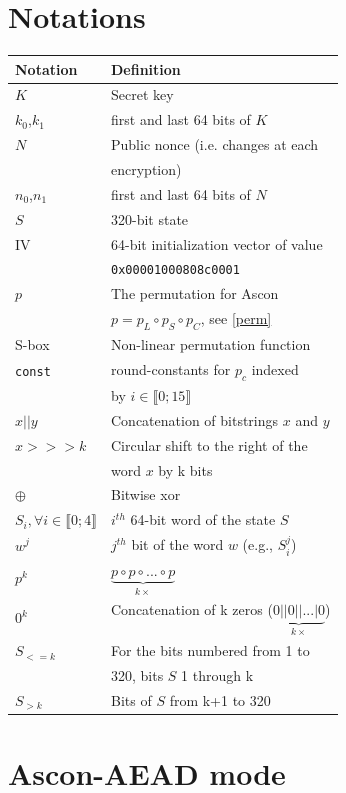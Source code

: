 \documentclass[11pt,technote]{IEEEtran}
\begin{document}
		\section{Notations} \label{notations}
		\begin{tabular}{ll}
				\hline
				\textbf{Notation}&\textbf{Definition}\\
				\hline
				$K$&Secret key\\
				$k_0$,$k_1$&first and last 64 bits of $K$\\
				$N$&Public nonce (i.e. changes at each\\
				&encryption)\\
				$n_0$,$n_1$&first and last 64 bits of $N$\\
				$S$&320-bit state\\
				IV&64-bit initialization vector of value\\
				&\verb|0x00001000808c0001|\\
				$p$&The permutation for Ascon \\
				&$p=p_L \circ p_S \circ p_C$, see \ref{perm}\\
				S-box&Non-linear permutation function\\
				\verb|const|&round-constants for $p_c$ indexed \\
				&by $i \in \llbracket 0;15 \rrbracket$ \\
				\hline
				$x||y$&Concatenation of bitstrings $x$ and $y$\\
				$x>>>k$&Circular shift to the right of the\\
				&word $x$ by k bits\\
				$\oplus$&Bitwise xor\\
				\hline
				$S_i, \forall i \in \llbracket 0;4 \rrbracket$&$i^{th}$ 64-bit word of the state $S$\\
				$w^j$&$j^{th}$ bit of the word $w$ (e.g., $S_i^j$) \\
				$p^k$&$\underbrace{p \circ p \circ ... \circ p}_{k \times}$\\
				$0^k$&Concatenation of k zeros ($\underbrace{0||0|| ... |0}_{k \times}$)\\
				$S_{<=k}$&For the bits numbered from 1 to\\
				&320, bits $S$ 1 through k\\
				$S_{>k}$&Bits of $S$ from k+1 to 320\\
				\hline
			\end{tabular}
			
		
		\section{Ascon-AEAD mode}
		
\end{document}
